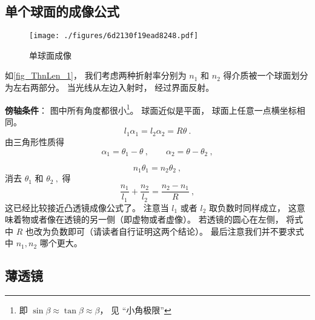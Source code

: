 


\subsection{单个球面的成像公式}
\begin{figure}[ht]
\centering
\texttt{[image: ./figures/6d2130f19ead8248.pdf]}
\caption{单球面成像} \label{fig_ThnLen_1}
\end{figure}

如\autoref{fig_ThnLen_1}， 我们考虑两种折射率分别为 $n_1$ 和 $n_2$ 得介质被一个球面划分为左右两部分。 当光线从左边入射时， 经过界面反射。

\textbf{傍轴条件}： 图中所有角度都很小\footnote{即 $\sin\beta \approx \tan\beta \approx \beta$， 见 “小角极限”}。 球面近似是平面， 球面上任意一点横坐标相同。
\begin{equation}
l_1 \alpha_1 = l_2 \alpha_2 = R\theta~.
\end{equation}
由三角形性质得
\begin{equation}
\alpha_1 = \theta_1 - \theta ~,\qquad
\alpha_2 = \theta - \theta_2~,
\end{equation}

\begin{equation}
n_1 \theta_1 = n_2 \theta_2~,
\end{equation}
消去 $\theta_1$ 和 $\theta_2~,$ 得
\begin{equation}
\frac{n_1}{l_1} + \frac{n_2}{l_2} = \frac{n_2 - n_1}{R}~,
\end{equation}
这已经比较接近凸透镜成像公式了。 注意当 $l_1$ 或者 $l_2$ 取负数时同样成立， 这意味着物或者像在透镜的另一侧（即虚物或者虚像）。 若透镜的圆心在左侧， 将式中 $R$ 也改为负数即可（请读者自行证明这两个结论）。 最后注意我们并不要求式中 $n_1, n_2$ 哪个更大。

\subsection{薄透镜}

